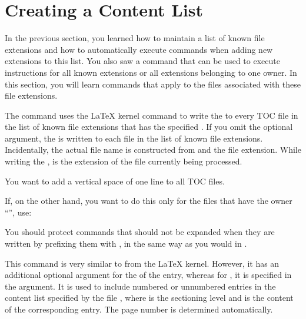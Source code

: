\section{Creating a Content List}
\label{sec:tocbasic.toc}

In the previous section, you learned how to maintain a list of known file
extensions and how to automatically execute commands when adding new
extensions to this list. You also saw a command that can be used to execute
instructions for all known extensions or all extensions belonging to one
owner. In this section, you will learn commands that apply to the files
associated with these file extensions.

\begin{Declaration}
\end{Declaration}
The  command uses the \LaTeX{} kernel command
 to write the  to every TOC file in the list of known file extensions that has the specified
. If you omit the optional argument, the  is
written to each file in the list of known file extensions. Incidentally, the
actual file name is constructed from  and the file extension.
While writing the ,
 is the
extension of the file currently being processed.
\begin{Example}
  You want to add a vertical space of one line to all TOC files.
\begin{lstcode}
    \addtoeachtocfile{%
      \protect\addvspace{\protect\baselineskip}%
    }
\end{lstcode}
  If, on the other hand, you want to do this only for the files that have the
  owner ``'', use:
\begin{lstcode}
    \addtoeachtocfile[foo]{%
      \protect\addvspace{\protect\baselineskip}%
    }
\end{lstcode}
\end{Example}
You should protect commands that should not be expanded when they are written
by prefixing them with , in the same way as you would in
.
\EndIndexGroup


\begin{Declaration}
\end{Declaration}
This command is very similar to
 from the \LaTeX{} kernel.
However, it has an additional optional argument for the 
of the entry, whereas for , it is specified in the
 argument. It is used to include numbered or unnumbered entries in
the content list specified by the file , where 
is the sectioning level and  is the content of the corresponding
entry. The page number is determined automatically.

